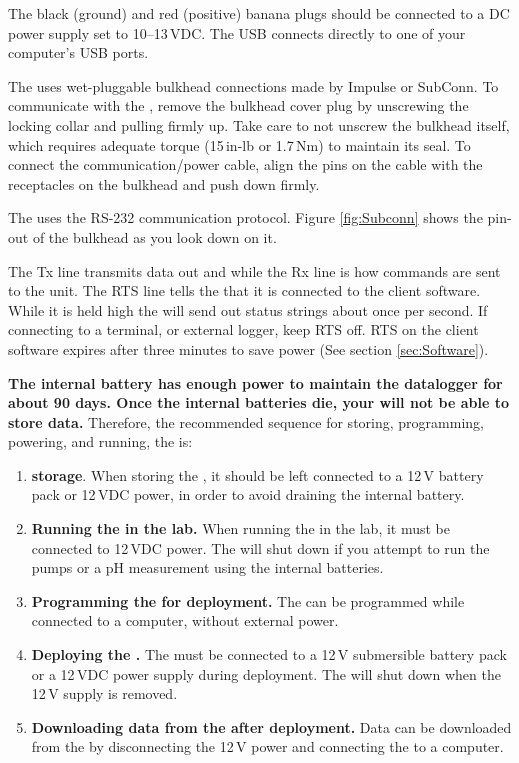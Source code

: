 The black (ground) and red (positive) banana plugs should be connected to a DC power supply set to 10--13\,VDC. The USB connects directly to one of your computer's USB ports.

The \instType{} uses wet-pluggable bulkhead connections made by Impulse or SubConn.  To communicate with the \instType{}, remove the bulkhead cover plug by unscrewing the locking collar and pulling firmly up. Take care to not unscrew the bulkhead itself, which requires adequate torque (15\,in-lb or 1.7\,Nm) to maintain its seal. To connect the communication/power cable, align the pins on the cable with the receptacles on the \instType{} bulkhead and push down firmly.

The \instType{} uses the RS-232 communication protocol. Figure \ref{fig:Subconn} shows the pin-out of the bulkhead as you look down on it.

The Tx line transmits data out and while the Rx line is how commands are sent to the unit. The RTS line tells the \instType{} that it is connected to the client software. While it is held high the \instType{} will send out status strings about once per second. If connecting to a terminal, or external logger, keep RTS off.  RTS on the client software expires after three minutes to save power (See section \ref{sec:Software}).

    \textbf{The \instType{} internal battery has enough power to maintain the datalogger for about 90 days. Once the internal batteries die, your \instType{} will not be able to store data.} Therefore, the recommended sequence for storing, programming, powering, and running, the \instType{} is:
    
    \begin{enumerate}
    \item[]\textbf{\instType{} storage}. When storing the \instType{}, it should be left connected to a 12\,V battery pack or 12\,VDC power, in order to avoid draining the internal battery.
    
    \item[]\textbf{Running the \instType{} in the lab.} When running the \instType{} in the lab, it must be connected to 12\,VDC power.  The \instType{} will shut down if you attempt to run the pumps or a pH measurement using the internal batteries.
    
    \item[]\textbf{Programming the \instType{} for deployment.} The \instType{} can be programmed while connected to a computer, without external power.
    
    \item[]\textbf{Deploying the \instType{}.} The \instType{} must be connected to a 12\,V submersible battery pack or a 12\,VDC power supply during deployment.  The \instType{} will shut down when the 12\,V supply is removed.
    
    \item[]\textbf{Downloading data from the \instType{} after deployment.} Data can be downloaded from the \instType{} by disconnecting the 12\,V power and connecting the \instType{} to a computer.
    \end{enumerate}

